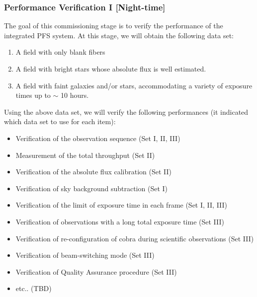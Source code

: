 \subsubsection{Performance Verification I [Night-time]}\label{secflow:PV1}



The goal of this commissioning stage is to verify the performance of the integrated PFS system. 
At this stage, we will obtain the following data set:
\begin{enumerate}
\renewcommand{\labelenumi}{Set \Roman{enumi}).}
\setlength{\leftskip}{20mm}
\item A field with only blank fibers
\item A field with bright stars whose absolute flux is well estimated.
\item A field with faint galaxies and/or stars, accommodating a variety of exposure times up to $\sim$ 10 hours.
\end{enumerate}


Using the above data set, we will verify the following performances (it indicated which data set to use for each item):
\begin{itemize}
\item{Verification of the observation sequence (Set I, II, III)}
\item{Measurement of the total throughput (Set II)}
\item{Verification of the absolute flux calibration (Set II)}
\item{Verification of sky background subtraction (Set I)}
\item{Verification of the limit of exposure time in each frame (Set I, II, III)}
\item{Verification of observations with a long total exposure time (Set III)}
\item{Verification of re-configuration of cobra during scientific observations (Set III)}
\item{Verification of beam-switching mode (Set III)}
\item{Verification of Quality Assurance procedure (Set III)}
\item{ etc.. (TBD)}
\end{itemize}

